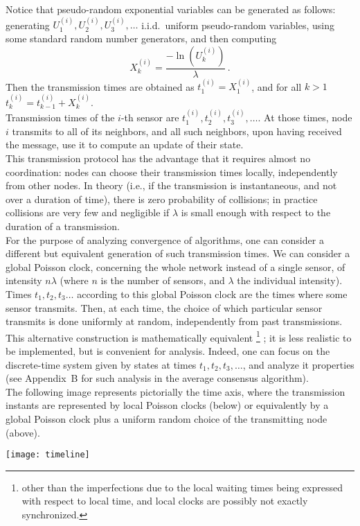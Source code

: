 \documentclass{article}
\begin{document}
Notice that pseudo-random exponential variables can be generated as follows: generating $U_1^{(i)}, U_2^{(i)},U_3^{(i)}, \dots$ i.i.d.~uniform pseudo-random variables, using some standard random number generators, and then computing
\[ X_k^{(i)} = \frac{-\ln(U_k^{(i)})}{\lambda} \,.\]
Then the transmission times are obtained as $t_1^{(i)} = X_1^{(i)}$, and for all $k >1$  $t_k^{(i)} = t_{k-1}^{(i)} +X_k^{(i)}$.\\


Transmission times of the $i$-th sensor are $t_1^{(i)}, t_2^{(i)}, t_3^{(i)}, \dots$.
At those times, node $i$ transmits to all of its neighbors, and all such neighbors, upon having received the message, use it to compute an update of their state. \\

This transmission protocol has the advantage that it requires almost no coordination: nodes can choose their transmission times locally, independently from other nodes. In theory (i.e., if the transmission is instantaneous, and not over a duration of time), there is zero probability of collisions; in practice collisions are very few and negligible if $\lambda$ is small enough with respect to the duration of a transmission.\\

For the purpose of analyzing convergence of algorithms, one can consider a different but equivalent generation of such transmission times. We can consider a global Poisson clock, concerning the whole network instead of a single sensor, of intensity $n \lambda$ (where $n$ is the number of sensors, and $\lambda$ the individual intensity). Times $t_1, t_2, t_3 \dots$ according to this global Poisson clock are the times where some sensor transmits. Then, at each time, the choice of which particular sensor transmits is done uniformly at random, independently from past transmissions. This alternative construction is mathematically equivalent%
\footnote{other than the imperfections due to the local waiting times being expressed with respect to local time, and local clocks are possibly not exactly synchronized.}%
; it  is less realistic to be implemented, but is convenient for analysis. Indeed, one can focus on the discrete-time system given by states at times $t_1, t_2, t_3, \dots$, and analyze it properties (see Appendix~B for such analysis in the average consensus algorithm).\\


The following image represents pictorially
the time axis, where the transmission instants are represented by local Poisson clocks (below) or equivalently by a global Poisson clock plus a uniform random choice of the transmitting node (above).
\begin{center}
\texttt{[image: timeline]}
\end{center}
\end{document}
